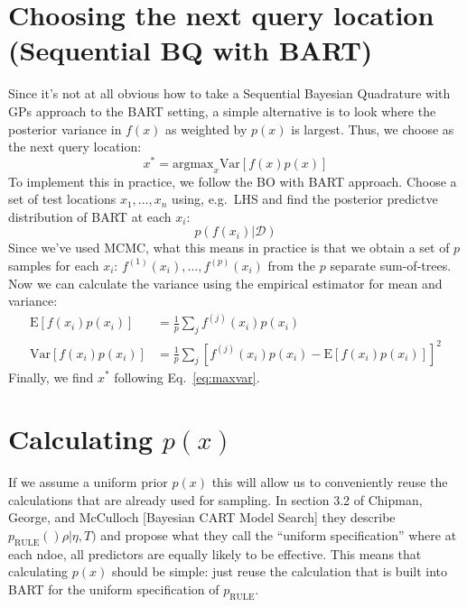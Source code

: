 \documentclass[12pt]{article}
\begin{document}
\section{Choosing the next query location (Sequential BQ with BART)}
Since it's not at all obvious how to take a Sequential Bayesian Quadrature with GPs approach to the BART setting,
a simple alternative is to look where the posterior variance in $f(x)$ as weighted by $p(x)$ is largest.
Thus, we choose as the next query location:
\begin{equation}
	x^* = \mbox{argmax}_{x} \mbox{Var}[f(x)p(x)]
	\label{eq:maxvar}
\end{equation}
To implement this in practice, we follow the BO with BART approach. Choose a set of test locations $x_1, \ldots, x_n$
using, e.g.~LHS and find the posterior predictve distribution of BART at each $x_i$:
\begin{equation}
	p(f(x_i) | \mathcal{D})
\end{equation}
Since we've used MCMC, what this means in practice is that we obtain a set of $p$ samples for each $x_i$: $f^{(1)}(x_i), \ldots, f^{(p)}(x_i)$ from the $p$ separate sum-of-trees. 
Now we can calculate the variance using the empirical estimator for mean and variance:
\begin{align}
	\mbox{E}[f(x_i)p(x_i)] &= \frac{1}{p} \sum_j f^{(j)}(x_i)p(x_i) \\
	\mbox{Var}[f(x_i)p(x_i)] &= \frac{1}{p} \sum_j \left[f^{(j)}(x_i)p(x_i) - \mbox{E}[f(x_i)p(x_i)]\right]^2
\end{align}
Finally, we find $x^*$ following Eq.~\eqref{eq:maxvar}.

\section{Calculating $p(x)$}
If we assume a uniform prior $p(x)$ this will allow us to conveniently reuse the calculations that are already
used for sampling. In section 3.2 of Chipman, George, and McCulloch [Bayesian CART Model Search] they describe 
$p_{\mbox{RULE}}()\rho | \eta, T)$ and propose what they call the ``uniform specification'' where
at each ndoe, all predictors are equally likely to be effective. This means that calculating $p(x)$ should
be simple: just reuse the calculation that is built into BART for the uniform specification of $p_{\mbox{RULE}}$.
\end{document}

